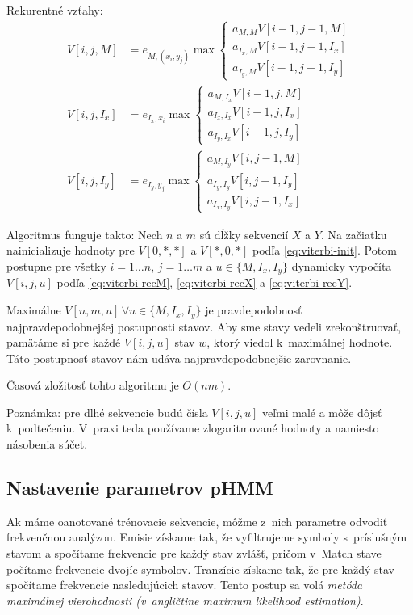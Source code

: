 Rekurentné vzťahy:
\begin{align}
\label{eq:viterbi-recM}
V[i,j,M] &= e_{M, (x_i, y_j)} \max \left\{
\begin{array}{l}
a_{M,M} V[i-1,j-1,M]\\
a_{I_x,M} V[i-1,j-1,I_x]\\
a_{I_y,M} V[i-1,j-1, I_y]
\end{array} \right.\\
\label{eq:viterbi-recX}
V[i,j, I_x] &= e_{I_x, x_i}\max \left\{
\begin{array}{l}
a_{M, I_x} V[i-1,j,M]\\
a_{I_x, I_x} V[i-1,j,I_x]\\
a_{I_y, I_x} V[i-1,j,I_y]
\end{array} \right.\\
\label{eq:viterbi-recY}
V[i,j, I_y] &= e_{I_y, y_j}\max \left\{
\begin{array}{l}
a_{M, I_y} V[i,j-1,M]\\
a_{I_y, I_y} V[i,j-1,I_y]\\
a_{I_x, I_y} V[i,j-1,I_x]
\end{array} \right.
\end{align}

Algoritmus funguje takto:
Nech $n$ a $m$ sú dĺžky sekvencií $X$ a $Y$.
Na začiatku nainicializuje hodnoty pre $V[0,*,*]$ a $V[*,0,*]$ podľa \ref{eq:viterbi-init}.
Potom postupne pre všetky $i = 1\dots n$, $j = 1\dots m$ a $u \in \{M, I_x, I_y\}$ dynamicky vypočíta $V[i, j, u]$ podľa \ref{eq:viterbi-recM}, \ref{eq:viterbi-recX} a \ref{eq:viterbi-recY}.

Maximálne $V[n, m, u]\, \forall u \in \{M, I_x, I_y\}$ je pravdepodobnosť najpravdepodobnejšej postupnosti stavov.
Aby sme stavy vedeli zrekonštruovať, pamätáme si pre každé $V[i, j, u]$ stav $w$, ktorý viedol k~maximálnej hodnote. Táto postupnosť stavov nám udáva najpravdepodobnejšie zarovnanie.

Časová zložitosť tohto algoritmu je $O(nm)$.

Poznámka: pre dlhé sekvencie budú čísla $V[i, j, u]$ veľmi malé a môže dôjsť k~podtečeniu. V~praxi teda používame zlogaritmované hodnoty a namiesto násobenia súčet.
\cite{durbin}

\subsection{Nastavenie parametrov pHMM}
\label{subsec:hmmtraining}
Ak máme oanotované trénovacie sekvencie, môžme z~nich parametre odvodiť frekvenčnou analýzou. Emisie získame tak, že vyfiltrujeme symboly s~príslušným stavom a spočítame frekvencie pre každý stav zvlášť, pričom v~Match stave počítame frekvencie dvojíc symbolov. Tranzície získame tak, že pre každý stav spočítame frekvencie nasledujúcich stavov. Tento postup sa volá \textit{metóda maximálnej vierohodnosti (v~angličtine maximum likelihood estimation)}. \cite{ durbin, wiki:mle}

